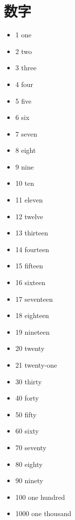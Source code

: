 \documentclass[10pt]{jsarticle}
\newcommand{\answer}[2]{{\color{orange}#2}}
\newcommand{\answer}[2]{\vspace{#1mm}}
\begin{document}
\section{数字}
\begin{screen}
  \begin{multicols}{4}
    \begin{itemize}
      \item 1 \answer{5}{one}
      \item 2 \answer{5}{two}
      \item 3 \answer{5}{three}
      \item 4 \answer{5}{four}
      \item 5 \answer{5}{five}
      \item 6 \answer{5}{six}
      \item 7 \answer{5}{seven}
      \item 8 \answer{5}{eight}
      \item 9 \answer{5}{nine}
      \item 10 \answer{5}{ten}
      \item 11 \answer{5}{eleven}
      \item 12 \answer{5}{twelve}
      \item 13 \answer{5}{thirteen}
      \item 14 \answer{5}{fourteen}
      \item 15 \answer{5}{fifteen}
      \item 16 \answer{5}{sixteen}
      \item 17 \answer{5}{seventeen}
      \item 18 \answer{5}{eighteen}
      \item 19 \answer{5}{nineteen}
      \item 20 \answer{5}{twenty}
      \item 21 \answer{5}{twenty-one}
      \item 30 \answer{5}{thirty}
      \item 40 \answer{5}{forty}
      \item 50 \answer{5}{fifty}
      \item 60 \answer{5}{sixty}
      \item 70 \answer{5}{seventy}
      \item 80 \answer{5}{eighty}
      \item 90 \answer{5}{ninety}
      \item 100 \answer{5}{one hundred}
      \item 1000 \answer{5}{one thousand}
    \end{itemize}
  \end{multicols}
\end{screen}
\end{document}
